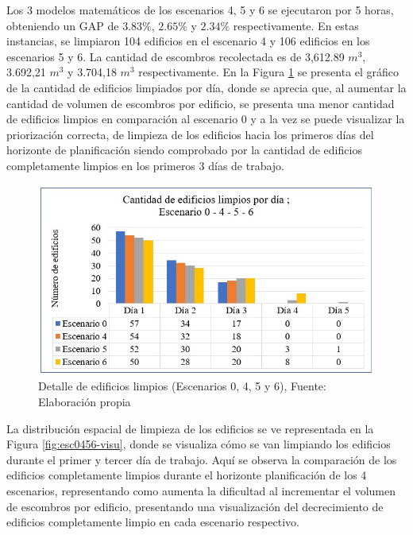 \documentclass[12pt,a4paper]{article}
\begin{document}
Los 3 modelos matemáticos de los escenarios 4, 5 y 6 se ejecutaron por 5 horas, obteniendo un GAP de $3.83\%$, $2.65\%$ y $2.34\%$ respectivamente. En estas instancias, se limpiaron 104 edificios en el escenario 4 y 106 edificios en los escenarios 5 y 6. La cantidad de escombros recolectada es de  3,612.89 $m^{3}$, 3.692,21 $m^{3}$  y  3.704,18 $m^{3}$ respectivamente.
En la Figura \ref{fig:esc0456graf} se presenta el gráfico de la cantidad de edificios limpiados por día, donde se aprecia que, al aumentar la cantidad de volumen de escombros por edificio, se presenta una menor cantidad de edificios limpios en comparación al escenario 0 y a la vez se puede visualizar la priorización correcta, de limpieza de los edificios hacia los primeros días del horizonte de planificación siendo comprobado por la cantidad de edificios completamente limpios en los primeros 3 días de trabajo.


\begin{figure}[h!]
\centering
\includegraphics[scale=0.8]{Figuras/INDIC4.jpg} 
\caption{Detalle de edificios limpios (Escenarios 0, 4, 5 y 6), Fuente: Elaboración propia}
\label{fig:esc0456graf}
\end{figure}



La distribución espacial de limpieza de los edificios se ve representada en la Figura \ref{fig:esc0456-visu}, donde se visualiza cómo se van limpiando los edificios durante el primer y tercer día de trabajo. Aquí se observa la comparación de los edificios completamente limpios durante el horizonte planificación de los 4 escenarios, representando como aumenta la dificultad al incrementar el volumen de escombros por edificio, presentando una visualización del decrecimiento de edificios completamente limpio en cada escenario respectivo.
\end{document}
